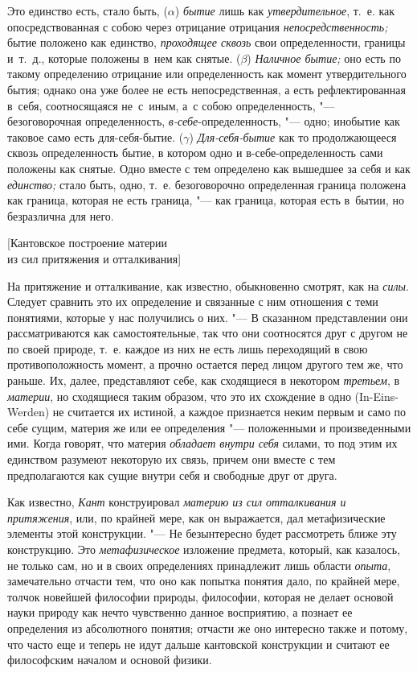 Это единство есть, стало быть, ($\alpha$) {\em бытие} лишь как
{\em утвердительное}, т.~е. как опосредствованная с собою через отрицание
отрицания {\em непосредственность;} бытие положено как единство,
{\em проходящее сквозь} свои определенности, границы и~т.~д., которые положены
в~нем как снятые. ($\beta$) {\em Наличное бытие;} оно есть по такому
определению отрицание или определенность как момент утвердительного бытия;
однако она уже более не есть непосредственная, а есть рефлектированная в~себя,
соотносящаяся не~с~иным, а~с собою определенность, "--- безоговорочная
определенность, {\em в-себе}-определенность, "--- одно; инобытие как таковое
само есть для-себя-бытие. ($\gamma$) {\em Для-себя-бытие} как то продолжающееся
сквозь определенность бытие, в котором одно и в-себе-определенность сами
положены как снятые. Одно вместе с тем определено как вышедшее за себя и как
{\em единство;} стало быть, одно, т.~е. безоговорочно определенная граница
положена как граница, которая не есть граница, "--- как граница, которая есть
в~бытии, но безразлична для него.

%
{[Кантовское построение материи\\из сил притяжения и отталкивания]}

На притяжение и отталкивание, как известно, обыкновенно смотрят, как на
{\em силы}. Следует сравнить это их определение и
связанные с ним отношения с теми понятиями, которые у нас получились о них.
"--- В сказанном представлении они рассматриваются как самостоятельные, так
что они соотносятся друг с другом не по своей природе, т.~е. каждое из них
не есть лишь переходящий в свою противоположность момент, а прочно остается
перед лицом другого тем же, что раньше. Их, далее, представляют себе, как
сходящиеся в некотором {\em третьем}, в
{\em материи}, но сходящиеся таким образом, что это их
схождение в одно (In-Eins-Werden) не считается их истиной, а каждое
признается неким первым и само по себе сущим, материя же или ее
определения "--- положенными и произведенными ими. Когда говорят, что материя
{\em обладает внутри себя} силами, то под этим их
единством разумеют некоторую их связь, причем они вместе с тем
предполагаются как сущие внутри себя и свободные друг от друга.

Как известно, {\em Кант} конструировал
{\em материю из сил отталкивания и притяжения}, или, по
крайней мере, как он выражается, дал метафизические элементы этой
конструкции. "--- Не безынтересно будет рассмотреть ближе эту конструкцию. Это
{\em метафизическое} изложение предмета, который, как
казалось, не только сам, но и в своих определениях принадлежит лишь области
{\em опыта}, замечательно отчасти тем, что оно как
попытка понятия дало, по крайней мере, толчок новейшей философии природы,
философии, которая не делает основой науки природу как нечто чувственно
данное восприятию, а познает ее определения из абсолютного понятия; отчасти
же оно интересно также и потому, что часто еще и теперь не идут дальше
кантовской конструкции и считают ее философским началом и основой физики.


